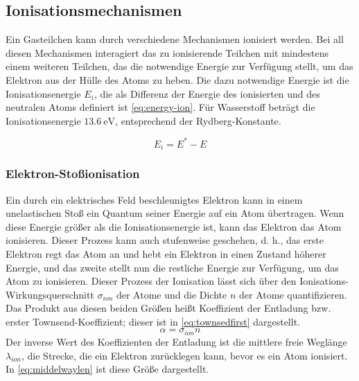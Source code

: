 \subsection{Ionisationsmechanismen}
Ein Gasteilchen kann durch verschiedene Mechanismen ionisiert werden. Bei all diesen Mechanismen interagiert das zu ionisierende Teilchen mit mindestens einem weiteren Teilchen, das die notwendige Energie zur Verfügung stellt, um das Elektron aus der Hülle des Atoms zu heben. Die dazu notwendige Energie ist die Ionisationsenergie \(E_i\), die als Differenz der Energie des ionisierten und des neutralen Atoms definiert ist \eqref{eq:energy-ion}. Für Wasserstoff beträgt die Ionisationsenergie \(\SI{13,6}{\electronvolt}\), entsprechend der Rydberg-Konstante.

\begin{equation}
    E_{i} = E^{*} - E
    \label{eq:energy-ion}
\end{equation}

\subsubsection{Elektron-Stoßionisation}
Ein durch ein elektrisches Feld beschleunigtes Elektron kann in einem unelastischen Stoß ein Quantum seiner Energie auf ein Atom übertragen. Wenn diese Energie größer als die Ionisationsenergie ist, kann das Elektron das Atom ionisieren. Dieser Prozess kann auch stufenweise geschehen, d. h., das erste Elektron regt das Atom an und hebt ein Elektron in einen Zustand höherer Energie, und das zweite stellt nun die restliche Energie zur Verfügung, um das Atom zu ionisieren. Dieser Prozess der Ionisation lässt sich über den Ionisations-Wirkungsquerschnitt \(\sigma_{ion}\) der Atome und die Dichte \(n\) der Atome quantifizieren. Das Produkt aus diesen beiden Größen heißt Koeffizient der Entladung bzw. erster Townsend-Koeffizient; dieser ist in \eqref{eq:townsedfirst} dargestellt.
\begin{equation}
    \alpha = \sigma_{ion} n
    \label{eq:townsedfirst}
\end{equation}
Der inverse Wert des Koeffizienten der Entladung ist die mittlere freie Weglänge \(\lambda_{ion}\), die Strecke, die ein Elektron zurücklegen kann, bevor es ein Atom ionisiert. In \eqref{eq:middelwaylen} ist diese Größe dargestellt.

